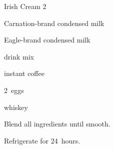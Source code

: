 \begin{recipe}{Irish Cream 2}{}{}

\begin{ingredients}
\item {} Carnation-brand condensed milk
\item {} Eagle-brand condensed milk
\item \tp{1\half}  drink mix
\item {} instant coffee
\item 2~eggs
\item \C{1\half} whiskey
\end{ingredients}

\begin{directions}
\item Blend all ingredients until smooth.
\item Refrigerate for 24~hours.
\end{directions}

\end{recipe}
